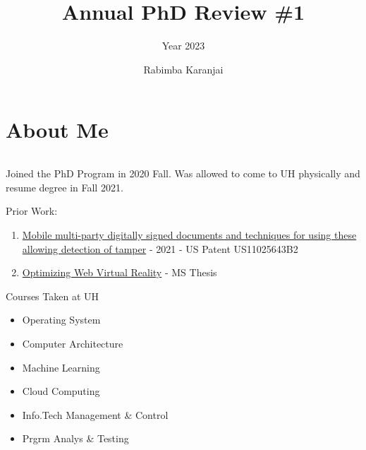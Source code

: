 \documentclass[10pt,aspectratio=169]{beamer}
\title{Annual PhD Review \#1}
\subtitle{Year 2023}
\author{Rabimba Karanjai}
\begin{document}
\sloppy

\maketitle

\section[fragile]{About Me}
\begin{frame}
\begin{columns}
\begin{column}{0.7\textwidth}
Joined the PhD Program in 2020 Fall. Was allowed to come to UH physically and resume degree in Fall 2021.
\begin{block}{Prior Work:}
\begin{enumerate}
\item \href{https://patents.google.com/patent/US11025643B2/en?q=(rabimba)&oq=rabimba}{Mobile multi-party digitally signed documents and techniques for using these allowing detection of tamper} - {2021} - {US Patent US11025643B2}
\item \href{https://scholarship.rice.edu/handle/1911/105623}{Optimizing Web Virtual Reality} - {MS Thesis}
\end{enumerate}
\end{block}
\begin{block}{Courses Taken at UH}
\begin{itemize}
\item Operating System
\item Computer Architecture
\item Machine Learning
\item Cloud Computing
\item Info.Tech Management \& Control
\item Prgrm Analys \& Testing
\end{itemize}
\end{block}


\end{column}
\end{columns}
\end{frame}
\end{document}
